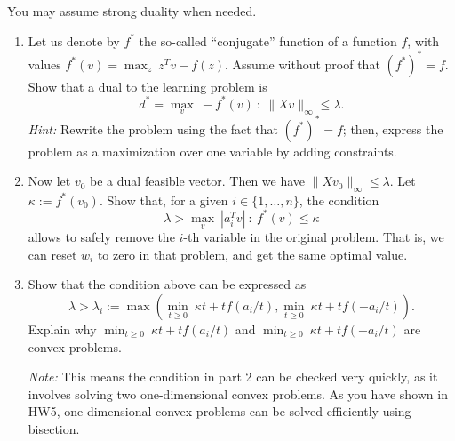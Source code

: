 \documentclass[11pt]{article}
\begin{document}
You may assume strong duality when needed.
\begin{enumerate}
\item Let us denote by $f^*$ the so-called ``conjugate'' function of a function $f$, with values $f^*(v) = \max_{z} \: z^T v - f(z)$. Assume without proof that ${(f^*)}^* = f$. Show that a dual to the learning problem is
\[
d^* = \max_v \: -f^*(v) ~:~ \|Xv\|_\infty \le \lambda.
\]
{\em Hint:} Rewrite the problem using the fact that $(f^*)^* = f$; then, express the problem as a maximization over one variable by adding constraints.

\item Now let $v_0$ be a dual feasible vector. Then we have $\|Xv_0\|_\infty \le \lambda$. Let $\kappa := f^*(v_0)$. Show that, for a given $i \in \{ 1, \ldots, n\}$,  the condition
\[
\lambda > \max_{v} \: |a_i^T v| ~:~  f^*(v) \le \kappa
\]
allows to safely remove the $i$-th variable in the original problem. That is, we can reset $w_i$ to zero in that problem, and get the same optimal value.

\item Show that the condition above can be expressed as
\[
\lambda > \lambda_i := \max\left( \min_{t\geq 0} \: \kappa t + t f(a_i/t), \min_{t \geq 0} \: \kappa t + t f(-a_i/t) \right).
\]
Explain why $\min_{t \geq 0} \: \kappa t + t f(a_i/t)$ and $\min_{t \geq 0} \: \kappa t + t f(-a_i/t)$ are convex problems.

{\em Note:} This means the condition in part 2 can be checked very quickly, as it involves solving two one-dimensional convex problems. As you have shown in HW5, one-dimensional convex problems can be solved efficiently using bisection.

\end{enumerate}
\end{document}
